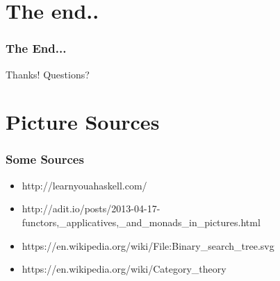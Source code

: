 \documentclass[12pt, xcolor=table]{beamer}
\begin{document}
\section{The end..} %
\begin{frame}
    \frametitle{The End...}
    \begin{block}{Thanks!}
        Questions?
    \end{block}
\end{frame}

\section{Picture Sources}
\begin{frame}
    \frametitle{Some Sources}
    \begin{itemize}
        \item \tiny{http://learnyouahaskell.com/}
        \item \tiny{http://adit.io/posts/2013-04-17-functors,\_applicatives,\_and\_monads\_in\_pictures.html}
        \item \tiny{https://en.wikipedia.org/wiki/File:Binary\_search\_tree.svg}
        \item \tiny{https://en.wikipedia.org/wiki/Category\_theory}
    \end{itemize}
\end{frame}
\end{document}
